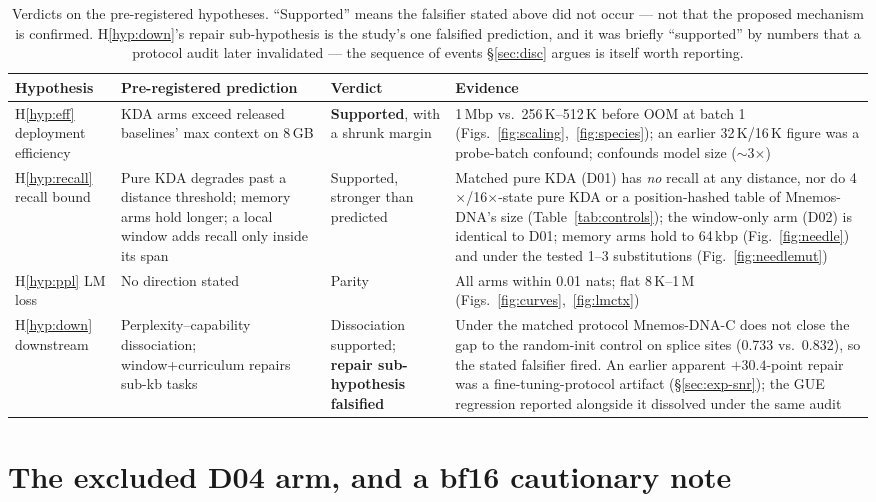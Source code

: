 \documentclass[11pt]{article}
\theoremstyle{plain}
\newcommand{\best}[1]{\textbf{#1}}
\begin{document}
\begin{table}[h]
\centering\small
\begin{tabular}{p{2.0cm}p{4.3cm}p{3.4cm}p{4.3cm}}
\toprule
Hypothesis & Pre-registered prediction & Verdict & Evidence \\
\midrule
H\ref{hyp:eff} deployment efficiency & KDA arms exceed released baselines' max context on 8\,GB &
\best{Supported}, with a shrunk margin & 1\,Mbp vs.\ 256\,K--512\,K before OOM at batch 1
(Figs.~\ref{fig:scaling},~\ref{fig:species}); an earlier 32\,K/16\,K figure was a probe-batch
confound; confounds model size ($\sim$3$\times$) \\
H\ref{hyp:recall} recall bound & Pure KDA degrades past a distance threshold; memory arms hold
longer; a local window adds recall only inside its span & Supported, stronger than predicted &
Matched pure KDA (D01) has \emph{no} recall at any distance, nor do 4$\times$/16$\times$-state
pure KDA or a position-hashed table of Mnemos-DNA's size (Table~\ref{tab:controls}); the
window-only arm (D02) is identical to D01; memory arms hold to 64\,kbp (Fig.~\ref{fig:needle}) and under the tested 1--3
substitutions (Fig.~\ref{fig:needlemut}) \\
H\ref{hyp:ppl} LM loss & No direction stated & Parity & All arms within 0.01 nats; flat
8\,K--1\,M (Figs.~\ref{fig:curves},~\ref{fig:lmctx}) \\
H\ref{hyp:down} downstream & Perplexity--capability dissociation; window+curriculum repairs
sub-kb tasks & Dissociation supported; \textbf{repair sub-hypothesis falsified} & Under the
matched protocol Mnemos-DNA-C does not close the gap to the random-init control on splice sites
(0.733 vs.\ 0.832), so the stated falsifier fired. An earlier apparent $+30.4$-point repair was
a fine-tuning-protocol artifact (\S\ref{sec:exp-snr}); the GUE regression reported alongside it
dissolved under the same audit \\
\bottomrule
\end{tabular}
\caption{Verdicts on the pre-registered hypotheses. ``Supported'' means the falsifier stated above
did not occur --- not that the proposed mechanism is confirmed. H\ref{hyp:down}'s repair
sub-hypothesis is the study's one falsified prediction, and it was briefly ``supported'' by
numbers that a protocol audit later invalidated --- the sequence of events \S\ref{sec:disc}
argues is itself worth reporting.}
\label{tab:verdicts}
\end{table}

\section{The excluded D04 arm, and a bf16 cautionary note}\label{sec:d04}
\end{document}
